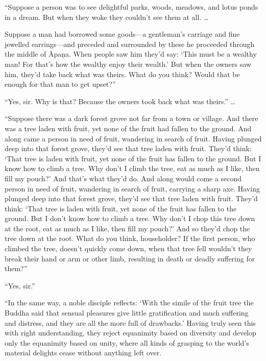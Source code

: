 \documentclass[12pt,openany]{book}%
\begin{document}
“Suppose a person was to see delightful parks, woods, meadows, and lotus ponds in a dream. But when they woke they couldn’t see them at all. … 

Suppose a man had borrowed some goods—a gentleman’s carriage and fine jewelled earrings—and preceded and surrounded by these he proceeded through the middle of \textsanskrit{Āpaṇa}. When people saw him they’d say: ‘This must be a wealthy man! For that’s how the wealthy enjoy their wealth.’ But when the owners saw him, they’d take back what was theirs. What do you think? Would that be enough for that man to get upset?” 

“Yes, sir. Why is that? Because the owners took back what was theirs.” … 

“Suppose there was a dark forest grove not far from a town or village. And there was a tree laden with fruit, yet none of the fruit had fallen to the ground. And along came a person in need of fruit, wandering in search of fruit. Having plunged deep into that forest grove, they’d see that tree laden with fruit. They’d think: ‘That tree is laden with fruit, yet none of the fruit has fallen to the ground. But I know how to climb a tree. Why don’t I climb the tree, eat as much as I like, then fill my pouch?’ And that’s what they’d do. And along would come a second person in need of fruit, wandering in search of fruit, carrying a sharp axe. Having plunged deep into that forest grove, they’d see that tree laden with fruit. They’d think: ‘That tree is laden with fruit, yet none of the fruit has fallen to the ground. But I don’t know how to climb a tree. Why don’t I chop this tree down at the root, eat as much as I like, then fill my pouch?’ And so they’d chop the tree down at the root. What do you think, householder? If the first person, who climbed the tree, doesn’t quickly come down, when that tree fell wouldn’t they break their hand or arm or other limb, resulting in death or deadly suffering for them?” 

“Yes, sir.” 

“In the same way, a noble disciple reflects: ‘With the simile of the fruit tree the Buddha said that sensual pleasures give little gratification and much suffering and distress, and they are all the more full of drawbacks.’ Having truly seen this with right understanding, they reject equanimity based on diversity and develop only the equanimity based on unity, where all kinds of grasping to the world’s material delights cease without anything left over. 
\end{document}
